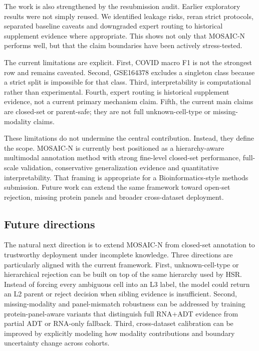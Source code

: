\documentclass[unnumsec,webpdf,contemporary,large,numbered]{oup-authoring-template}
\begin{document}
The work is also strengthened by the resubmission audit. Earlier exploratory results were not simply reused. We identified leakage risks, reran strict protocols, separated baseline caveats and downgraded expert routing to historical supplement evidence where appropriate. This shows not only that MOSAIC-N performs well, but that the claim boundaries have been actively stress-tested.

The current limitations are explicit. First, COVID macro F1 is not the strongest row and remains caveated. Second, GSE164378 excludes a singleton class because a strict split is impossible for that class. Third, interpretability is computational rather than experimental. Fourth, expert routing is historical supplement evidence, not a current primary mechanism claim. Fifth, the current main claims are closed-set or parent-safe; they are not full unknown-cell-type or missing-modality claims.

These limitations do not undermine the central contribution. Instead, they define the scope. MOSAIC-N is currently best positioned as a hierarchy-aware multimodal annotation method with strong fine-level closed-set performance, full-scale validation, conservative generalization evidence and quantitative interpretability. That framing is appropriate for a Bioinformatics-style methods submission. Future work can extend the same framework toward open-set rejection, missing protein panels and broader cross-dataset deployment.

\subsection{Future directions}

The natural next direction is to extend MOSAIC-N from closed-set annotation to trustworthy deployment under incomplete knowledge. Three directions are particularly aligned with the current framework. First, unknown-cell-type or hierarchical rejection can be built on top of the same hierarchy used by HSR. Instead of forcing every ambiguous cell into an L3 label, the model could return an L2 parent or reject decision when sibling evidence is insufficient. Second, missing-modality and panel-mismatch robustness can be addressed by training protein-panel-aware variants that distinguish full RNA+ADT evidence from partial ADT or RNA-only fallback. Third, cross-dataset calibration can be improved by explicitly modeling how modality contributions and boundary uncertainty change across cohorts.
\end{document}
